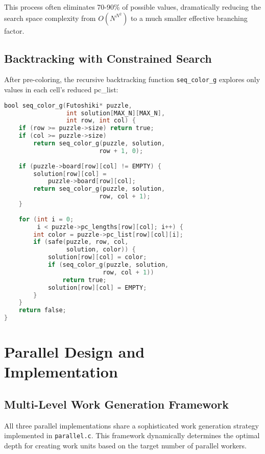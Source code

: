\documentclass[10pt, conference]{IEEEtran}
\begin{document}
This process often eliminates 70-90\% of possible values, dramatically reducing the search space complexity from $O(N^{N^2})$ to a much smaller effective branching factor.

\subsection{Backtracking with Constrained Search}
After pre-coloring, the recursive backtracking function \texttt{seq\_color\_g} explores only values in each cell's reduced pc\_list:

\begin{lstlisting}[language=C, caption=Sequential backtracking core]
bool seq_color_g(Futoshiki* puzzle, 
                 int solution[MAX_N][MAX_N], 
                 int row, int col) {
    if (row >= puzzle->size) return true;
    if (col >= puzzle->size) 
        return seq_color_g(puzzle, solution, 
                          row + 1, 0);
    
    if (puzzle->board[row][col] != EMPTY) {
        solution[row][col] = 
            puzzle->board[row][col];
        return seq_color_g(puzzle, solution, 
                          row, col + 1);
    }
    
    for (int i = 0; 
         i < puzzle->pc_lengths[row][col]; i++) {
        int color = puzzle->pc_list[row][col][i];
        if (safe(puzzle, row, col, 
                 solution, color)) {
            solution[row][col] = color;
            if (seq_color_g(puzzle, solution, 
                           row, col + 1))
                return true;
            solution[row][col] = EMPTY;
        }
    }
    return false;
}
\end{lstlisting}

\section{Parallel Design and Implementation}

\subsection{Multi-Level Work Generation Framework}
All three parallel implementations share a sophisticated work generation strategy implemented in \texttt{parallel.c}. This framework dynamically determines the optimal depth for creating work units based on the target number of parallel workers.
\end{document}

